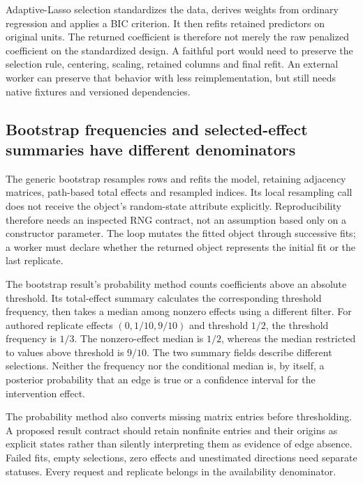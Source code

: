 Adaptive-Lasso selection standardizes the data, derives weights from
ordinary regression and applies a BIC criterion. It then refits retained
predictors on original units. The returned coefficient is therefore not
merely the raw penalized coefficient on the standardized design. A faithful
port would need to preserve the selection rule, centering, scaling,
retained columns and final refit. An external worker can preserve that
behavior with less reimplementation, but still needs native fixtures and
versioned dependencies.~\citep{exec24_lingam_source,exec24_lingam_choice}

\subsection{Bootstrap frequencies and selected-effect summaries have different denominators}
The generic bootstrap resamples rows and refits the model, retaining
adjacency matrices, path-based total effects and resampled indices.
Its local resampling call does not receive the object's random-state
attribute explicitly. Reproducibility therefore needs an inspected RNG
contract, not an assumption based only on a constructor parameter.
The loop mutates the fitted object through successive fits; a worker must
declare whether the returned object represents the initial fit or the
last replicate.~\citep{exec24_lingam_source}

The bootstrap result's probability method counts coefficients above an
absolute threshold. Its total-effect summary calculates the corresponding
threshold frequency, then takes a median among nonzero effects using a
different filter. For authored replicate effects $(0,1/10,9/10)$ and
threshold $1/2$, the threshold frequency is $1/3$. The nonzero-effect
median is $1/2$, whereas the median restricted to values above threshold
is $9/10$. The two summary fields describe different selections.
Neither the frequency nor the conditional median is, by itself, a
posterior probability that an edge is true or a confidence interval for
the intervention effect.~\citep{exec24_lingam_source,exec24_lingam_choice}

The probability method also converts missing matrix entries before
thresholding. A proposed result contract should retain nonfinite entries
and their origins as explicit states rather than silently interpreting
them as evidence of edge absence. Failed fits, empty selections, zero
effects and unestimated directions need separate statuses. Every request
and replicate belongs in the availability denominator.
\citep{exec24_lingam_source,exec24_lingam_choice}

